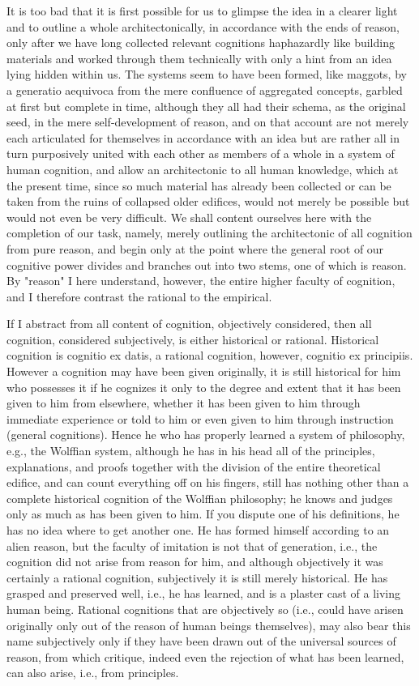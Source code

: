 \documentclass{article}
\begin{document}
It is too bad that it is first possible for us to glimpse
the idea in a clearer light and to outline a whole architectonically,
in accordance with the ends of reason,
only after we have long collected relevant cognitions haphazardly
like building materials and worked through them technically
with only a hint from an idea lying hidden within us. 
The systems seem to have been formed, like maggots, by a generatio aequivoca
from the mere confluence of aggregated concepts, 
garbled at first but complete in time,
although they all had their schema, as the original seed,
in the mere self-development of reason,
and on that account are not
merely each articulated for themselves in accordance with an idea
but are rather all in turn purposively united with each other
as members of a whole in a system of human cognition,
and allow an architectonic to all human knowledge,
which at the present time, since so much material has already been collected
or can be taken from the ruins of collapsed older edifices,
would not merely be possible but would not even be very difficult.
We shall content ourselves here with the completion of our task, namely,
merely outlining the architectonic of all cognition from pure reason, 
and begin only at the point where the general root of our cognitive power
 divides and branches out into two stems, one of which is reason. 
By "reason" I here understand, however, the entire higher faculty of cognition,
and I therefore contrast the rational to the empirical.

If I abstract from all content of cognition, objectively considered,
then all cognition, considered subjectively, is either historical or rational.
Historical cognition is cognitio ex datis,
a rational cognition, however, cognitio ex principiis.
However a cognition may have been given originally,
it is still historical for him who possesses it if he cognizes it
only to the degree and extent that it has been given to him from elsewhere,
whether it has been given to him through immediate experience
or told to him or even given to him through instruction (general cognitions).
Hence he who has properly learned a system of philosophy,
e.g., the Wolffian system,
although he has in his head all of the principles, explanations, and proofs
together with the division of the entire theoretical edifice,
and can count everything off on his fingers,
still has nothing other than a complete historical cognition
of the Wolffian philosophy;
he knows and judges only as much as has been given to him.
If you dispute one of his definitions,
he has no idea where to get another one. 
He has formed himself according to an alien reason,
but the faculty of imitation is not that of generation,
i.e., the cognition did not arise from reason for him,
and although objectively it was certainly a rational cognition, 
subjectively it is still merely historical.
He has grasped and preserved well, i.e., he has learned,
and is a plaster cast of a living human being.
Rational cognitions that are objectively so (i.e.,
could have arisen originally only out of
the reason of human beings themselves),
may also bear this name subjectively only if 
they have been drawn out of the universal sources of reason,
from which critique, indeed even the rejection of what has been learned,
can also arise, i.e., from principles.
\end{document}
